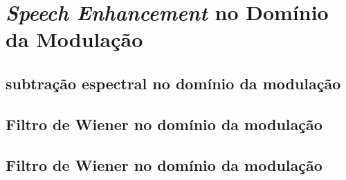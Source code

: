 \section{\textit{Speech Enhancement} no Domínio da Modulação}
\subsection{subtração espectral no domínio da modulação}
\subsection{Filtro de Wiener no domínio da modulação}
\subsection{Filtro de Wiener no domínio da modulação}